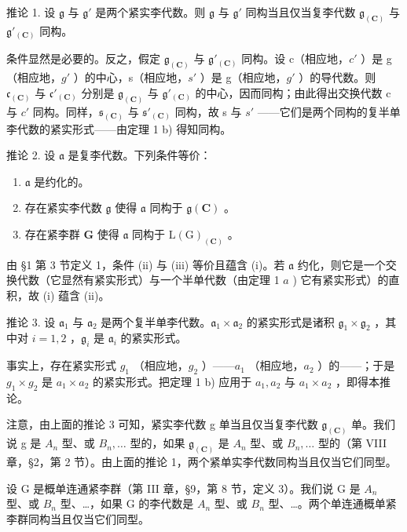 推论 1. 设 \(\mathfrak{g}\) 与 \(\mathfrak{g}'\) 是两个紧实李代数。则 \(\mathfrak{g}\) 与 \(\mathfrak{g}'\) 同构当且仅当复李代数 \(\mathfrak{g}_{(\mathbf{C})}\) 与 \(\mathfrak{g}'_{(\mathbf{C})}\) 同构。

条件显然是必要的。反之，假定 \(\mathfrak{g}_{(\mathbf{C})}\) 与 \(\mathfrak{g}'_{(\mathbf{C})}\) 同构。设 c（相应地，\(c'\) ）是 g（相应地，\(g'\) ）的中心，s（相应地，\(s'\) ）是 g（相应地，\(g'\) ）的导代数。则 \(\mathfrak{c}_{(\mathbf{C})}\) 与 \(\mathfrak{c}'_{(\mathbf{C})}\) 分别是 \(\mathfrak{g}_{(\mathbf{C})}\) 与 \(\mathfrak{g}'_{(\mathbf{C})}\) 的中心，因而同构；由此得出交换代数 c 与 \(c'\) 同构。同样，\(\mathfrak{s}_{(\mathbf{C})}\) 与 \(\mathfrak{s}'_{(\mathbf{C})}\) 同构，故 s 与 \(s'\) ——它们是两个同构的复半单李代数的紧实形式——由定理 1 b) 得知同构。

推论 2. 设 \(\mathfrak{a}\) 是复李代数。下列条件等价：

\begin{enumerate}
\def\labelenumi{(\roman{enumi})}
\item
  \(\mathfrak{a}\) 是约化的。
\item
  存在紧实李代数 \(\mathfrak{g}\) 使得 \(\mathfrak{a}\) 同构于 \(\mathfrak{g}(\mathbf{C})\) 。
\item
  存在紧李群 \(\mathbf{G}\) 使得 \(\mathfrak{a}\) 同构于 \(\mathrm{L}(\mathrm{G})_{(\mathbf{C})}\) 。
\end{enumerate}

由 §1 第 3 节定义 1，条件 (ii) 与 (iii) 等价且蕴含 (i)。若 \(\mathfrak{a}\) 约化，则它是一个交换代数（它显然有紧实形式）与一个半单代数（由定理 1 \(a\) ) 它有紧实形式）的直积，故 (i) 蕴含 (ii)。

推论 3. 设 \(\mathfrak{a}_1\) 与 \(\mathfrak{a}_2\) 是两个复半单李代数。\(\mathfrak{a}_1 \times \mathfrak{a}_2\) 的紧实形式是诸积 \(\mathfrak{g}_1 \times \mathfrak{g}_2\) ，其中对 \(i = 1, 2\) ，\(\mathfrak{g}_i\) 是 \(\mathfrak{a}_i\) 的紧实形式。

事实上，存在紧实形式 \(g_{1}\) （相应地，\(g_{2}\) ）——\(a_{1}\) （相应地，\(a_{2}\) ）的——；于是 \(g_{1} \times g_{2}\) 是 \(a_{1} \times a_{2}\) 的紧实形式。把定理 1 b) 应用于 \(a_{1}, a_{2}\) 与 \(a_{1} \times a_{2}\) ，即得本推论。

注意，由上面的推论 3 可知，紧实李代数 g 单当且仅当复李代数 \(\mathfrak{g}_{(\mathbf{C})}\) 单。我们说 g 是 \(A_{n}\) 型、或 \(B_{n}, \ldots\) 型的，如果 \(\mathfrak{g}_{(\mathbf{C})}\) 是 \(A_{n}\) 型、或 \(B_{n}, \ldots\) 型的（第 VIII 章，§2，第 2 节）。由上面的推论 1，两个紧单实李代数同构当且仅当它们同型。

设 G 是概单连通紧李群（第 III 章，§9，第 8 节，定义 3）。我们说 G 是 \(A_{n}\) 型、或 \(B_{n}\) 型、\ldots，如果 G 的李代数是 \(A_{n}\) 型、或 \(B_{n}\) 型、\ldots。两个单连通概单紧李群同构当且仅当它们同型。

